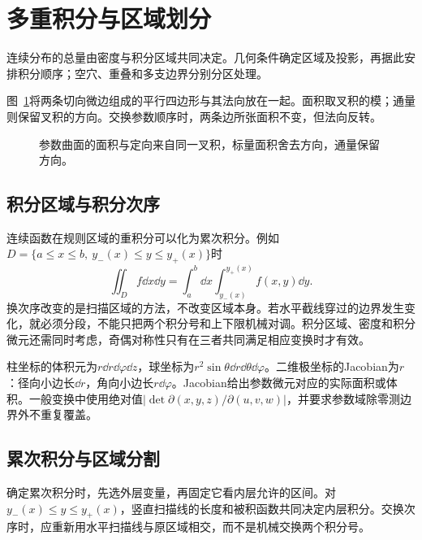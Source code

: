 \section{多重积分与区域划分}\label{sec:c4-multiple}
连续分布的总量由密度与积分区域共同决定。几何条件确定区域及投影，再据此安排积分顺序；空穴、重叠和多支边界分别分区处理。

图~\ref{fig:c4-oriented-area}将两条切向微边组成的平行四边形与其法向放在一起。面积取叉积的模；通量则保留叉积的方向。交换参数顺序时，两条边所张面积不变，但法向反转。
\begin{figure}[H]\centering
{}
\caption{参数曲面的面积与定向来自同一叉积，标量面积舍去方向，通量保留方向。}\label{fig:c4-oriented-area}
\end{figure}

\subsection{积分区域与积分次序}
连续函数在规则区域的重积分可以化为累次积分。例如$D=\{a\le x\le b,\ y_-(x)\le y\le y_+(x)\}$时
\[\iint_D f\dd x\dd y=\int_a^b\!\dd x\int_{y_-(x)}^{y_+(x)}f(x,y)\dd y.
\]
换次序改变的是扫描区域的方法，不改变区域本身。若水平截线穿过的边界发生变化，就必须分段，不能只把两个积分号和上下限机械对调。积分区域、密度和积分微元还需同时考虑，奇偶对称性只有在三者共同满足相应变换时才有效。

柱坐标的体积元为$r\dd r\dd\varphi\dd z$，球坐标为$r^2\sin\theta\dd r\dd\theta\dd\varphi$。二维极坐标的Jacobian为$r$：径向小边长$\dd r$，角向小边长$r\dd\varphi$。Jacobian给出参数微元对应的实际面积或体积。一般变换中使用绝对值$|\det\partial(x,y,z)/\partial(u,v,w)|$，并要求参数域除零测边界外不重复覆盖。

\subsection{累次积分与区域分割}
确定累次积分时，先选外层变量，再固定它看内层允许的区间。对$y_-(x)\le y\le y_+(x)$，竖直扫描线的长度和被积函数共同决定内层积分。交换次序时，应重新用水平扫描线与原区域相交，而不是机械交换两个积分号。

